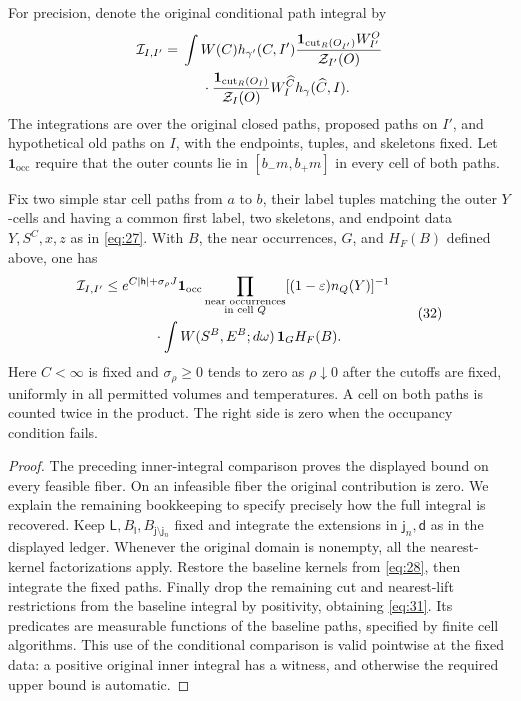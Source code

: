 For precision, denote the original conditional path integral by
\[
\begin{split}
 \mathcal I_{I,I'}={}&\int W(C)h_{\gamma'}(C,I')
 \frac{\mathbf1_{\mathrm{cut}_R(O_{I'})}W_{I'}^O}
      {\mathcal Z_{I'}(O)}\\
 &\hspace{5mm}\cdot
 \frac{\mathbf1_{\mathrm{cut}_R(O_I)}}{\mathcal Z_I(O)}
                    W_I^{\widehat C}h_\gamma(\widehat C,I).
\end{split}
\]
The integrations are over the original closed paths, proposed paths on
$I'$, and hypothetical old paths on $I$, with the endpoints, tuples, and
skeletons fixed. Let $\mathbf1_{\mathrm{occ}}$ require that the outer
counts lie in $[b_-m,b_+m]$ in every cell of both paths.

\begin{lemma}\label{lem:cross}
Fix two simple star cell paths from $a$ to $b$, their label tuples
matching the outer $Y$-cells and having a common first label,
two skeletons, and endpoint data $Y,S^C,x,z$ as in \eqref{eq:27}.
With $B$, the near occurrences, $G$, and $H_F(B)$ defined above, one has
\[
\begin{split}
 \mathcal I_{I,I'}\le{}&
 e^{C|\mathsf h|+\sigma_\rho J}\mathbf1_{\mathrm{occ}}
 \prod_{\substack{\text{near occurrences}\\\text{in cell }Q}}
                              [(1-\varepsilon)n_Q(Y)]^{-1}\\
 &\hspace{8mm}\cdot\int W(S^B,E^B;d\omega)\,\mathbf1_G H_F(B).
\end{split}\tag{32}\label{eq:31}
\]
Here $C<\infty$ is fixed and $\sigma_\rho\ge0$ tends to zero as
$\rho\downarrow0$ after the cutoffs are fixed, uniformly in all permitted
volumes and temperatures. A cell on both paths is counted twice in the
product. The right side is zero when the occupancy condition fails.
\end{lemma}
\begin{proof}
The preceding inner-integral comparison proves the displayed bound on
every feasible fiber. On an infeasible fiber the original contribution
is zero. We explain the remaining bookkeeping to specify precisely how
the full integral is recovered.
Keep $\mathsf L,B_{\mathsf l},B_{\mathsf j\setminus\mathsf j_n}$ fixed
and integrate the extensions in $\mathsf j_n,\mathsf d$ as in the
displayed ledger. Whenever the original domain is nonempty, all the
nearest-kernel factorizations apply. Restore the baseline kernels from
\eqref{eq:28}, then integrate the fixed paths. Finally drop the remaining
cut and nearest-lift restrictions from the baseline integral by
positivity, obtaining \eqref{eq:31}. Its predicates are measurable
functions of the baseline paths, specified by finite cell algorithms.
This use of the conditional comparison is valid pointwise at the fixed
data: a positive original inner integral has a witness, and otherwise
the required upper bound is automatic.

\end{proof}


